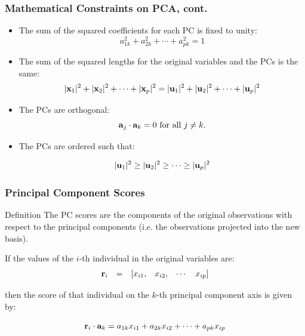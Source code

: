 \documentclass{beamer}
\begin{document}
\begin{frame}
  \frametitle{Mathematical Constraints on PCA, cont.}


\begin{itemize}
	\item The sum of the squared coefficients for each PC is fixed to unity:
\[
a_{1k}^2 + a_{2k}^2 + \cdots + a_{pk}^2 = 1
\]

	\item The sum of the squared lengths for the original variables and the PCs is the same:
\[
|\mathbf{x}_1|^2 + |\mathbf{x}_2|^2 + \cdots + |\mathbf{x}_p|^2 = |\mathbf{u}_1|^2 + |\mathbf{u}_2|^2 + \cdots + |\mathbf{u}_p|^2
\]	

	\item The PCs are orthogonal:
\[
\mathbf{a}_j \cdot \mathbf{a}_k = 0 \mbox{ for all } j \neq k.
\]

	\item The PCs are ordered such that:

\[
 |\mathbf{u}_1|^2 \geq |\mathbf{u}_2|^2  \geq \cdots \geq |\mathbf{u}_p|^2
\]

\end{itemize}

\end{frame}



\begin{frame}
  \frametitle{Principal Component Scores}

\begin{block}{Definition}
The PC scores are the components of the original observations with respect to the principal components (i.e. the observations projected into the new basis).
\end{block}
\medskip

If the values of the $i$-th individual in the original variables are:
\[
\begin{array}{cccccc}
\mathbf{r}_i & = & [x_{i1}, & x_{i2}, & \cdots & x_{ip}]
\end{array}
\]

then the score of that individual on the $k$-th principal component axis is given by:

\[
\mathbf{r}_i \cdot \mathbf{a}_k = a_{1k}x_{i1} + a_{2k}x_{i2} + \cdots + a_{pk}x_{ip}
\]

\end{frame}
\end{document}
